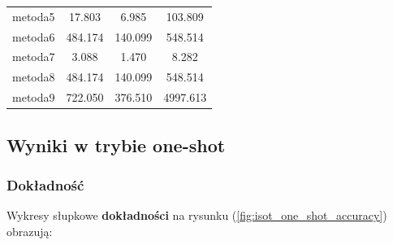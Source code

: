 \begin{table}[H]
\begin{tabular}{lccc}
		metoda5           & 17.803        & 6.985            & 103.809        \\
		metoda6           & 484.174       & 140.099          & 548.514        \\
		metoda7           & 3.088         & 1.470            & 8.282          \\
		metoda8           & 484.174       & 140.099          & 548.514        \\
		metoda9           & 722.050       & 376.510          & 4997.613       \\
		\bottomrule
	\end{tabular}
\end{table}

\subsection{Wyniki w trybie one-shot}
\subsubsection{Dokładność}
Wykresy słupkowe \textbf{dokładności} na rysunku (\ref{fig:isot_one_shot_accuracy}) obrazują:


